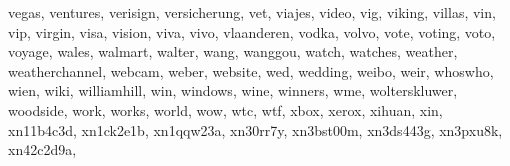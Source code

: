 \documentclass[letterpaper,10pt,english]{sphinxmanual}
\begin{document}
\begin{fulllineitems}
\begin{fulllineitems}
\textquotesingle{}vegas\textquotesingle{}, \textquotesingle{}ventures\textquotesingle{}, \textquotesingle{}verisign\textquotesingle{}, \textquotesingle{}versicherung\textquotesingle{}, \textquotesingle{}vet\textquotesingle{}, \textquotesingle{}viajes\textquotesingle{}, \textquotesingle{}video\textquotesingle{}, \textquotesingle{}vig\textquotesingle{}, \textquotesingle{}viking\textquotesingle{}, \textquotesingle{}villas\textquotesingle{}, \textquotesingle{}vin\textquotesingle{}, \textquotesingle{}vip\textquotesingle{}, \textquotesingle{}virgin\textquotesingle{}, \textquotesingle{}visa\textquotesingle{}, \textquotesingle{}vision\textquotesingle{}, \textquotesingle{}viva\textquotesingle{}, \textquotesingle{}vivo\textquotesingle{}, \textquotesingle{}vlaanderen\textquotesingle{}, \textquotesingle{}vodka\textquotesingle{}, \textquotesingle{}volvo\textquotesingle{}, \textquotesingle{}vote\textquotesingle{}, \textquotesingle{}voting\textquotesingle{}, \textquotesingle{}voto\textquotesingle{}, \textquotesingle{}voyage\textquotesingle{}, \textquotesingle{}wales\textquotesingle{}, \textquotesingle{}walmart\textquotesingle{}, \textquotesingle{}walter\textquotesingle{}, \textquotesingle{}wang\textquotesingle{}, \textquotesingle{}wanggou\textquotesingle{}, \textquotesingle{}watch\textquotesingle{}, \textquotesingle{}watches\textquotesingle{}, \textquotesingle{}weather\textquotesingle{}, \textquotesingle{}weatherchannel\textquotesingle{}, \textquotesingle{}webcam\textquotesingle{}, \textquotesingle{}weber\textquotesingle{}, \textquotesingle{}website\textquotesingle{}, \textquotesingle{}wed\textquotesingle{}, \textquotesingle{}wedding\textquotesingle{}, \textquotesingle{}weibo\textquotesingle{}, \textquotesingle{}weir\textquotesingle{}, \textquotesingle{}whoswho\textquotesingle{}, \textquotesingle{}wien\textquotesingle{}, \textquotesingle{}wiki\textquotesingle{}, \textquotesingle{}williamhill\textquotesingle{}, \textquotesingle{}win\textquotesingle{}, \textquotesingle{}windows\textquotesingle{}, \textquotesingle{}wine\textquotesingle{}, \textquotesingle{}winners\textquotesingle{}, \textquotesingle{}wme\textquotesingle{}, \textquotesingle{}wolterskluwer\textquotesingle{}, \textquotesingle{}woodside\textquotesingle{}, \textquotesingle{}work\textquotesingle{}, \textquotesingle{}works\textquotesingle{}, \textquotesingle{}world\textquotesingle{}, \textquotesingle{}wow\textquotesingle{}, \textquotesingle{}wtc\textquotesingle{}, \textquotesingle{}wtf\textquotesingle{}, \textquotesingle{}xbox\textquotesingle{}, \textquotesingle{}xerox\textquotesingle{}, \textquotesingle{}xihuan\textquotesingle{}, \textquotesingle{}xin\textquotesingle{}, \textquotesingle{}xn\sphinxhyphen{}\sphinxhyphen{}11b4c3d\textquotesingle{}, \textquotesingle{}xn\sphinxhyphen{}\sphinxhyphen{}1ck2e1b\textquotesingle{}, \textquotesingle{}xn\sphinxhyphen{}\sphinxhyphen{}1qqw23a\textquotesingle{}, \textquotesingle{}xn\sphinxhyphen{}\sphinxhyphen{}30rr7y\textquotesingle{}, \textquotesingle{}xn\sphinxhyphen{}\sphinxhyphen{}3bst00m\textquotesingle{}, \textquotesingle{}xn\sphinxhyphen{}\sphinxhyphen{}3ds443g\textquotesingle{}, \textquotesingle{}xn\sphinxhyphen{}\sphinxhyphen{}3pxu8k\textquotesingle{}, \textquotesingle{}xn\sphinxhyphen{}\sphinxhyphen{}42c2d9a\textquotesingle{}, 
\end{fulllineitems}
\end{fulllineitems}
\end{document}
